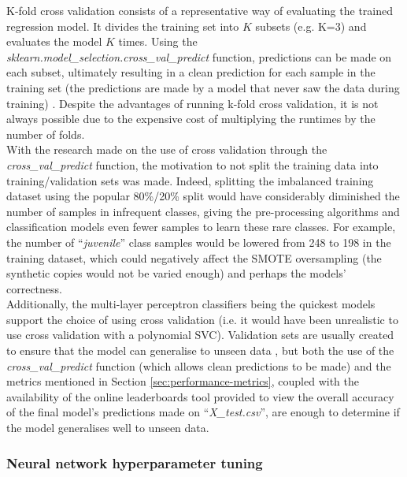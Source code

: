 \documentclass[letterpaper,12pt]{article}
\begin{document}
K-fold cross validation consists of a representative way of evaluating the trained regression model. It divides the training set into $K$ subsets (e.g. K=3) and evaluates the model $K$ times. Using the \textit{sklearn.model\_selection.cross\_val\_predict} function, predictions can be made on each subset, ultimately resulting in a clean prediction for each sample in the training set (the predictions are made by a model that never saw the data during training) \cite{Geron2019}. Despite the advantages of running k-fold cross validation, it is not always possible due to the expensive cost of multiplying the runtimes by the number of folds.\\

With the research made on the use of cross validation through the \textit{cross\_val\_predict} function, the motivation to not split the training data into training/validation sets was made. Indeed, splitting  the  imbalanced training dataset using the popular 80\%/20\% split would have considerably diminished the number of samples  in infrequent classes, giving the pre-processing algorithms and classification models even fewer samples to learn these rare classes. For example, the number of ``\textit{juvenile}'' class samples would be lowered from 248 to 198 in the training dataset, which could negatively affect the SMOTE oversampling (the synthetic copies would not be varied enough) and perhaps the models' correctness.\\

Additionally, the multi-layer perceptron classifiers being the quickest  models  support the choice of using cross validation (i.e. it would have been unrealistic to use cross  validation with a polynomial SVC). Validation sets are usually created to ensure that the model can generalise to unseen data  \cite{Geron2019}, but both the use of the \textit{cross\_val\_predict} function (which allows clean predictions to be made) and the metrics mentioned in Section \ref{sec:performance-metrics}, coupled with the availability of the online leaderboards tool provided to view the overall accuracy of the final model's predictions made on ``\textit{X\_test.csv}'', are enough to determine if the model generalises well to unseen data.

\subsubsection{Neural network hyperparameter tuning}
\end{document}
